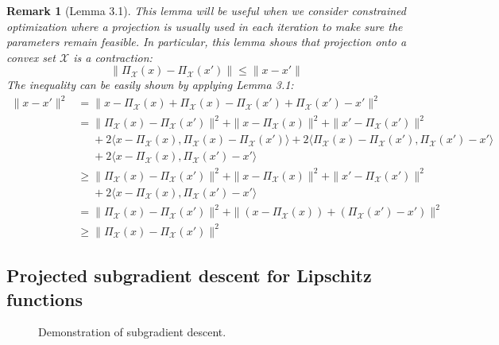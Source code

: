 \documentclass{scrartcl}
\newtheorem*{remark}{Remark}
\newcommand{\sX}{\mathcal{X}}
\begin{document}
\begin{remark}[Lemma 3.1]
This lemma will be useful when we consider constrained optimization where a projection is usually
used in each iteration to make sure the parameters remain feasible. In particular, this lemma shows
that projection onto a convex set $\sX$ is a \emph{contraction}:
\begin{equation}
  \|\Pi_\sX(x)-\Pi_\sX(x')\| \leq \|x-x'\|
\end{equation}
The inequality can be easily shown by applying Lemma 3.1:
\[
  \begin{aligned}
  \|x-x'\|^2
  &= \|x-\Pi_\sX(x) + \Pi_\sX(x)-\Pi_\sX(x') + \Pi_\sX(x') - x'\|^2 \\
  &= \|\Pi_\sX(x)-\Pi_\sX(x')\|^2 + \|x-\Pi_\sX(x)\|^2 + \|x'-\Pi_\sX(x')\|^2 \\
  &\mathrel{\phantom{=}}
     + 2\langle x-\Pi_\sX(x), \Pi_\sX(x)-\Pi_\sX(x')\rangle
     + 2\langle \Pi_\sX(x)-\Pi_\sX(x'), \Pi_\sX(x')-x'\rangle \\
  &\mathrel{\phantom{=}}
     + 2\langle x-\Pi_\sX(x), \Pi_\sX(x')-x'\rangle \\
  &\geq \|\Pi_\sX(x)-\Pi_\sX(x')\|^2 + \|x-\Pi_\sX(x)\|^2 + \|x'-\Pi_\sX(x')\|^2 \\
  &\mathrel{\phantom{=}}
     + 2\langle x-\Pi_\sX(x), \Pi_\sX(x')-x'\rangle \\
  &= \|\Pi_\sX(x)-\Pi_\sX(x')\|^2 + \|(x-\Pi_\sX(x)) + (\Pi_\sX(x')-x')\|^2 \\
  &\geq \|\Pi_\sX(x)-\Pi_\sX(x')\|^2
  \end{aligned}
\]
\end{remark}

\subsection{Projected subgradient descent for Lipschitz functions}

\begin{figure}
\centering
{}
\caption{Demonstration of subgradient descent.}
\label{fig:subgrad-descent-demo}
\end{figure}
\end{document}
